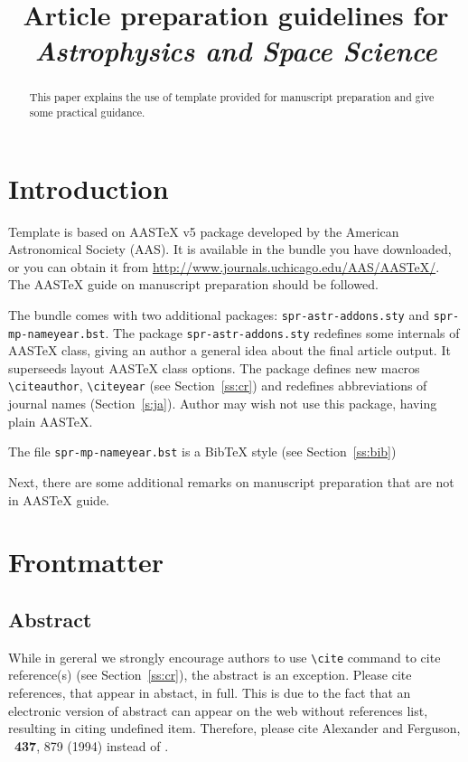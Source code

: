 \documentclass{aastex}
\begin{document}
\title{  Article preparation guidelines
  for\\  \textit{Astrophysics and Space Science}}



\begin{abstract}
This paper explains the use of template provided  for manuscript
preparation and give some practical guidance.
\end{abstract}


\section{Introduction}\label{s:intro}

Template is based on AAS\TeX{} v5 package developed 
by the American Astronomical
Society (AAS). It is available in the bundle you have downloaded, or
you can obtain it from  
\url{http://www.journals.uchicago.edu/AAS/AASTeX/}.
The AAS\TeX{} guide on manuscript preparation should be followed.

The bundle comes with two additional packages:
\verb!spr-astr-addons.sty!
and \verb!spr-mp-nameyear.bst!.
\linebreak The package \texttt{spr-astr-addons.sty} redefines some internals of
AAS\TeX{} class, giving an author a general idea about the final article output.
It superseeds layout AAS\TeX{} class options. The package defines new macros
\verb!\citeauthor!, \verb!\citeyear! (see Section~\ref{ss:cr}) and
redefines abbreviations of journal names (Section~\ref{s:ja}). 
Author may wish not use this package, having plain AAS\TeX.


The file \texttt{spr-mp-nameyear.bst} is a Bib\TeX{} style (see
Section~\ref{ss:bib})


Next, there are some additional remarks on manuscript preparation that are
not in AAS\TeX{} guide.


\section{Frontmatter}
\subsection{Abstract}\label{ss:abs} 
While in gereral we strongly encourage authors
to use \verb!\cite! command to cite reference(s) (see
Section~\ref{ss:cr}), the abstract is an exception.
Please cite references, that appear in abstact, in full. 
This is due to the fact that an electronic version of abstract can appear 
on the web without references list, resulting in citing undefined item.
Therefore, please cite \textsf{Alexander and Ferguson, \apj\ \textbf{437}, 879 (1994)}
 instead of 
\textsf{\cite{ale94}}.
\end{document}
